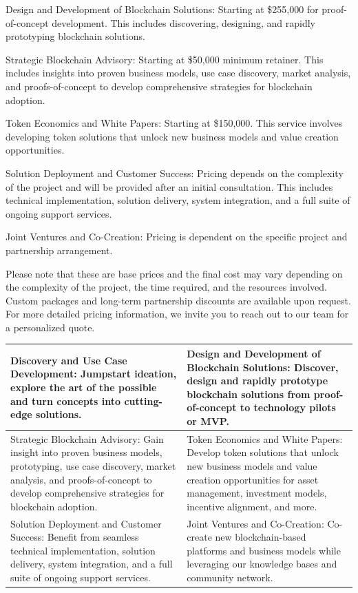 \documentclass[11pt]{article}
\begin{document}
Design and Development of Blockchain Solutions: Starting at \$255,000 for proof-of-concept development. This includes discovering, designing, and rapidly prototyping blockchain solutions.


Strategic Blockchain Advisory: Starting at \$50,000 minimum retainer. This includes insights into proven business models, use case discovery, market analysis, and proofs-of-concept to develop comprehensive strategies for blockchain adoption.


Token Economics and White Papers: Starting at \$150,000. This service involves developing token solutions that unlock new business models and value creation opportunities.


Solution Deployment and Customer Success: Pricing depends on the complexity of the project and will be provided after an initial consultation. This includes technical implementation, solution delivery, system integration, and a full suite of ongoing support services.


Joint Ventures and Co-Creation: Pricing is dependent on the specific project and partnership arrangement.


Please note that these are base prices and the final cost may vary depending on the complexity of the project, the time required, and the resources involved. Custom packages and long-term partnership discounts are available upon request. For more detailed pricing information, we invite you to reach out to our team for a personalized quote.


\begin{table}[htbp]
\centering
\begin{tabular}{l|l}
\toprule
Discovery and Use Case Development:
Jumpstart ideation, explore the art of the possible and turn concepts into cutting-edge solutions. & Design and Development of Blockchain Solutions:
Discover, design and rapidly prototype blockchain solutions from proof-of-concept to technology pilots or MVP. \\
\midrule
Strategic Blockchain Advisory:
Gain insight into proven business models, prototyping, use case discovery, market analysis, and proofs-of-concept to develop comprehensive strategies for blockchain adoption. & Token Economics and White Papers:
Develop token solutions that unlock new business models and value creation opportunities for asset management, investment models, incentive alignment, and more. \\
Solution Deployment and Customer Success:
Benefit from seamless technical implementation, solution delivery, system integration, and a full suite of ongoing support services. & Joint Ventures and Co-Creation:
Co-create new blockchain-based platforms and business models while leveraging our knowledge bases and community network. \\
\bottomrule
\end{tabular}
\end{table}
\end{document}
